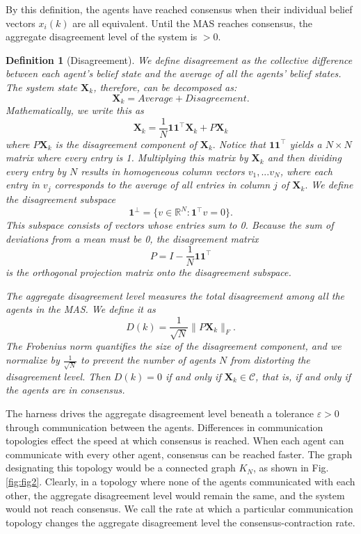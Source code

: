 \documentclass[journal,twoside,web]{ieeecolor_no_firstpage_logo}
\newtheorem{definition}{Definition}
\begin{document}
By this definition, the agents have reached consensus when their individual belief vectors $x_i(k)$ are all equivalent. Until the MAS reaches consensus, the aggregate disagreement level of the system is $> 0$. 
\begin{definition}[Disagreement]\label{def:disagreement}
We define disagreement as the collective difference between each agent's belief state and the \textit{average} of all the agents' belief states. The system state $\mathbf{X}_k$, therefore, can be decomposed as:
$$
\mathbf{X}_k = Average + Disagreement.
$$
Mathematically, we write this as 
\begin{equation}
\mathbf{X}_k = \frac{1}{N}\textbf{1}\textbf{1}^\top \mathbf{X}_k+ P\mathbf{X}_k
\end{equation}
where $P\mathbf{X}_k$ is the \textit{disagreement component} of $\mathbf{X}_k.$
Notice that $\textbf{1}\textbf{1}^\top$ yields a $N \times N$ matrix where every entry is 1. Multiplying this matrix by $\mathbf{X}_k$ and then dividing every entry by $N$ results in homogeneous column vectors $v_1,...v_N$, where each entry in $v_j$ corresponds to the average of all entries in column $j$ of $\mathbf{X}_k.$
We define the disagreement subspace
\begin{equation}
\mathbf 1^\perp
=
\{v\in\mathbb R^N:\mathbf 1^\top v=0\}.
\end{equation}
This subspace consists of vectors whose entries sum to 0. Because the sum of deviations from a mean must be 0, the disagreement matrix
\begin{equation}
P
=
I-\frac1N\mathbf 1\mathbf 1^\top
\end{equation}
is the orthogonal projection matrix onto the disagreement subspace.


The aggregate disagreement level measures the total disagreement among all the agents in the MAS. We define it as
\begin{equation} 
D(k)
=
\frac1{\sqrt N}\|P\mathbf{X}_k\|_F .
\label{eq:disagreement}
\end{equation}
The Frobenius norm quantifies the size of the disagreement component, and we normalize by $\frac{1}{\sqrt{N}}$ to prevent the number of agents $N$ from distorting the disagreement level. 
Then
$
D(k)=0
$
if and only if $\mathbf{X}_k\in\mathcal C$, that is, if and only if the agents
are in consensus.
\end{definition}

The harness drives the aggregate disagreement level beneath a tolerance $\varepsilon > 0$ through communication between the agents. Differences in communication topologies effect the speed at which consensus is reached. When each agent can communicate with every other agent, consensus can be reached faster. The graph designating this topology would be a connected graph $K_N$, as shown in Fig. \ref{fig:fig2}. Clearly, in a topology where none of the agents communicated with each other, the aggregate disagreement level would remain the same, and the system would not reach consensus. We call the rate at which a particular communication topology changes the aggregate disagreement level the consensus-contraction rate.
\end{document}
